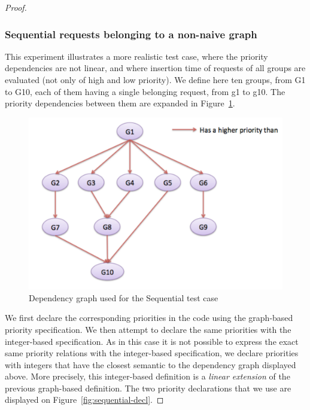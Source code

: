 \documentclass[11pt]{report}
\begin{document}
\begin{proof}
\subsubsection{Sequential requests belonging to a non-naive graph}
This experiment illustrates a more realistic test case, where the priority dependencies are not linear, and where insertion time of requests of all groups are evaluated (not only of high and low priority). We define here ten groups, from G1 to G10, each of them having a single belonging request, from g1 to g10. The priority dependencies between them are expanded in Figure~\ref{fig:complex}.

\begin{figure}[!ht]
      \begin{minipage}[c]{\textwidth}
      \centering
      \includegraphics[scale=0.5]{pictures/complex.pdf}
      \end{minipage}
      \caption{Dependency graph used for the Sequential test case}
      \label{fig:complex} 
\end{figure}

We first declare the corresponding priorities in the code using the graph-based priority specification. We then attempt to declare the same priorities with the integer-based specification. As in this case it is not possible to express the exact same priority relations with the integer-based specification, we declare priorities with integers that have the closest semantic to the dependency graph displayed above. More precisely, this integer-based definition is a \emph{linear extension} of the previous graph-based definition. The two priority declarations that we use are displayed on Figure~\ref{fig:sequential-decl}.


\end{proof}
\end{document}

